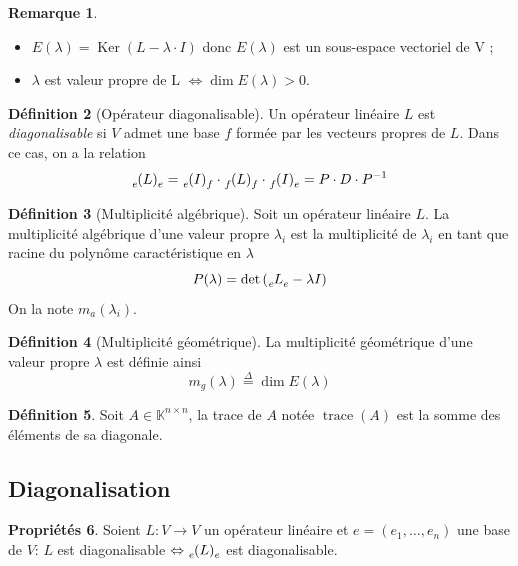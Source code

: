 \documentclass[11pt,a4paper]{article}
\theoremstyle{definition}
\newtheorem{mydef}{Définition}%
\newtheorem{myprop}[mydef]{Propriétés}
\newtheorem{myrem}[mydef]{Remarque}
\DeclareMathOperator{\trace}{trace}
\DeclareMathOperator{\newker}{Ker}
\DeclareMathOperator{\newdim}{dim}
\newcommand{\eqdef}{\stackrel{\Delta}{=}}
\newcommand{\K}{\mathbb{K}}
\newcommand{\Knn}{\K^{n \times n}}
\newcommand*\InsertTheoremBreak{%
	\begingroup %
		\setlength\itemsep{0pt}%
		\setlength\parsep{0pt}%
		\item[\vbox{\null}]%
	\endgroup%
}%
\begin{document}
\begin{myrem}
	\InsertTheoremBreak
	\begin{itemize}
		\item $E(\lambda) = \newker (L - \lambda \cdot I)$ donc $E(\lambda)$ est un sous-espace vectoriel de V ;
		\item $\lambda$ est valeur propre de L $\Leftrightarrow \newdim E(\lambda) > 0$.
	\end{itemize}
\end{myrem}

\begin{mydef}[Opérateur diagonalisable]
	Un opérateur linéaire $L$ est \emph{diagonalisable} si $V$ admet une base $f$ formée par les vecteurs propres de $L$. Dans ce cas, on a la relation
	\[ \tensor*[_e]{(L)}{_e}
	= \tensor*[_e]{(I)}{_f} \cdot \tensor*[_f]{(L)}{_f} \cdot \tensor*[_f]{(I)}{_e}
	= P \cdot D \cdot P^{-1} \]
\end{mydef}

\begin{mydef}[Multiplicité algébrique]
	Soit un opérateur linéaire $L$.
	La multiplicité algébrique d'une valeur propre $\lambda_i$ est la multiplicité de $\lambda_i$ en tant que racine du polynôme caractéristique en $\lambda$
	\[ P(\lambda) = \det \left( \tensor*[_e]{L}{_e} - \lambda I \right) \]
	On la note $m_a(\lambda_i)$.
\end{mydef}

\begin{mydef}[Multiplicité géométrique]
	La multiplicité géométrique d'une valeur propre $\lambda$ est définie ainsi
	\[ m_g(\lambda) \eqdef \newdim E(\lambda) \]
\end{mydef}

\begin{mydef}
	Soit $A \in \Knn$,
	la trace de $A$ notée $\trace(A)$ est la somme des éléments de sa diagonale.
\end{mydef}

\subsection{Diagonalisation}

\begin{myprop}
	Soient $L : V \to V$ un opérateur linéaire et $e = (e_1, \dots, e_n)$ une base de $V$:
	$L$ est diagonalisable $\Leftrightarrow \tensor[_e]{(L)}{_e}$ est diagonalisable.
\end{myprop}
\end{document}
